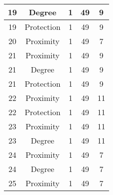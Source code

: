 \documentclass[results.tex]{subfiles}
\begin{document}
\begin{center}
\begin{tabular}{| c || c | c | c | c |}
            \hline
            19                      & Degree                       & 1                      & 49                      & 9                    \\
            \hline
            19                      & Protection                   & 1                      & 49                      & 9                    \\
            \hline
            20                      & Proximity                    & 1                      & 49                      & 7                    \\
            \hline
            21                      & Proximity                    & 1                      & 49                      & 9                    \\
            \hline
            21                      & Degree                       & 1                      & 49                      & 9                    \\
            \hline
            21                      & Protection                   & 1                      & 49                      & 9                    \\
            \hline
            22                      & Proximity                    & 1                      & 49                      & 11                   \\
            \hline
            22                      & Protection                   & 1                      & 49                      & 11                   \\
            \hline
            23                      & Proximity                    & 1                      & 49                      & 11                   \\
            \hline
            23                      & Degree                       & 1                      & 49                      & 11                   \\
            \hline
            24                      & Proximity                    & 1                      & 49                      & 7                    \\
            \hline
            24                      & Degree                       & 1                      & 49                      & 7                    \\
            \hline
            25                      & Proximity                    & 1                      & 49                      & 7                    \\

\end{tabular}
\end{center}
\end{document}
